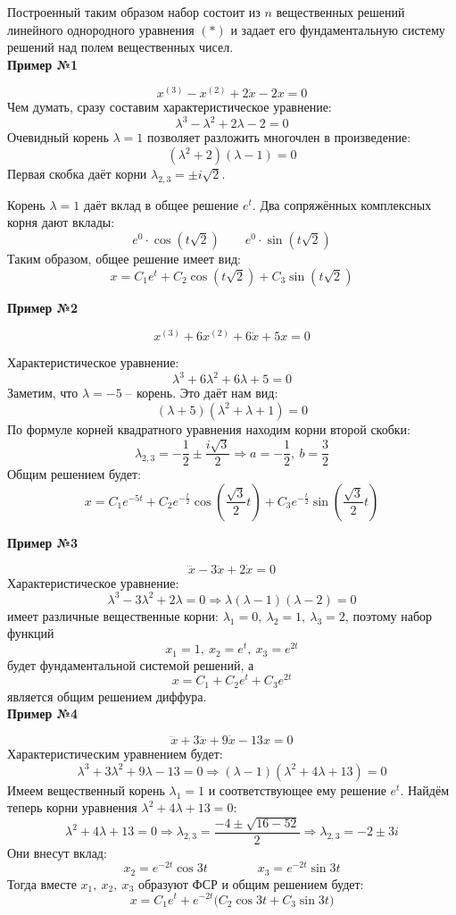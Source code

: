 \documentclass[a4paper,12pt]{article}
\newcommand{\dx}{\dot{x}}
\newcommand{\ddx}{\ddot{x}}
\newcommand{\dddx}{\dddot{x}}
\newcommand{\bto}{\Longrightarrow}
\begin{document}
Построенный таким образом набор состоит из $n$ вещественных решений линейного однородного уравнения $(*)$ и задает его фундаментальную систему решений над полем вещественных чисел.
\ \\

\textbf{Пример №1}

\[x^{(3)} - x^{(2)} + 2\dx - 2x = 0\]
Чем думать, сразу составим характеристическое уравнение:
\[\lambda^3 - \lambda^2 + 2\lambda - 2 = 0\]
Очевидный корень $\lambda = 1$ позволяет разложить многочлен в произведение:
\[(\lambda^2 + 2)(\lambda - 1) = 0\]
Первая скобка даёт корни $\lambda_{2,3} = \pm i\sqrt{2}$.

Корень $\lambda = 1$ даёт вклад в общее решение $e^t$. Два сопряжённых комплексных корня дают вклады:
\[e^0\cdot \cos(t\sqrt{2})\qquad e^0\cdot \sin(t\sqrt{2})\]
Таким образом, общее решение имеет вид:
\[x = C_1e^t + C_2\cos(t\sqrt{2}) + C_3\sin(t\sqrt{2})\]

\textbf{Пример №2}

\[x^{(3)} + 6x^{(2)} + 6\dx + 5x = 0\]

Характеристическое уравнение:
\[\lambda^3 + 6\lambda^2 + 6\lambda + 5 = 0\]
Заметим, что $\lambda = -5$ -- корень. Это даёт нам вид:
\[(\lambda + 5)(\lambda^2 +\lambda + 1) = 0\]
По формуле корней квадратного уравнения находим корни второй скобки:
\[\lambda_{2,3} = -\dfrac{1}{2}\pm\dfrac{i\sqrt{3}}{2} \bto a = -\dfrac{1}{2},\ b = \dfrac{3}{2}\]
Общим решением будет:
\[x = C_1e^{-5t} + C_2e^{-\frac{t}{2}}\cos(\dfrac{\sqrt{3}}{2}t) + C_3e^{-\frac{t}{2}}\sin(\dfrac{\sqrt{3}}{2}t)\]

\textbf{Пример №3}

\[\dddx - 3\ddx + 2\dx  = 0\]
Характеристическое уравнение:
\[\lambda^3 - 3\lambda^2 + 2\lambda = 0 \bto \lambda(\lambda - 1)(\lambda - 2) = 0\]
имеет различные вещественные корни: $\lambda_1 = 0,\ \lambda_2 = 1,\ \lambda_3 = 2$, поэтому набор функций
\[x_1 = 1,\ x_2 = e^t,\ x_3 = e^{2t}\]
будет фундаментальной системой решений, а 
\[x = C_1 + C_2 e^t + C_3e^{2t}\]
является общим решением диффура.
\ \\

\textbf{Пример №4}

\[\dddx + 3\ddx + 9\dx - 13x = 0\]
Характеристическим уравнением будет:
\[\lambda^3 + 3\lambda^2 + 9\lambda - 13 = 0 \bto (\lambda - 1)(\lambda^2 + 4\lambda + 13) = 0\]
Имеем вещественный корень $\lambda_1 = 1$ и соответствующее ему решение $e^t$.
Найдём теперь корни уравнения $\lambda^2 + 4\lambda + 13 = 0$:
\[\lambda^2 + 4\lambda + 13 = 0 \bto \lambda_{2,3} = \dfrac{-4 \pm \sqrt{16 - 52}}{2} \bto \lambda_{2,3} = -2 \pm 3i\]
Они внесут вклад:
\[x_2 = e^{-2t}\cos 3t\qquad \qquad x_3 = e^{-2t}\sin 3t\]
Тогда вместе $x_1,\ x_2,\ x_3$ образуют ФСР и общим решением будет:
\[x = C_1e^t + e^{-2t}\big(C_2\cos 3t + C_3\sin 3t\big)\]
\end{document}
